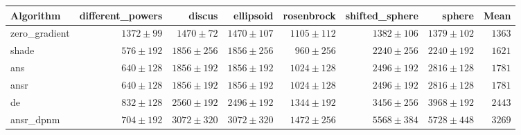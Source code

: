 \begin{tabular}{lrrrrrrr}
\toprule
Algorithm & different\_powers & discus & ellipsoid & rosenbrock & shifted\_sphere & sphere & Mean \\
\midrule
zero\_gradient & $1372 \pm 99$ & $1470 \pm 72$ & $1470 \pm 107$ & $1105 \pm 112$ & $1382 \pm 106$ & $1379 \pm 102$ & $1363$ \\
shade & $576 \pm 192$ & $1856 \pm 256$ & $1856 \pm 256$ & $960 \pm 256$ & $2240 \pm 256$ & $2240 \pm 192$ & $1621$ \\
ans & $640 \pm 128$ & $1856 \pm 192$ & $1856 \pm 192$ & $1024 \pm 128$ & $2496 \pm 192$ & $2816 \pm 128$ & $1781$ \\
ansr & $640 \pm 128$ & $1856 \pm 192$ & $1856 \pm 192$ & $1024 \pm 128$ & $2496 \pm 192$ & $2816 \pm 128$ & $1781$ \\
de & $832 \pm 128$ & $2560 \pm 192$ & $2496 \pm 192$ & $1344 \pm 192$ & $3456 \pm 256$ & $3968 \pm 192$ & $2443$ \\
ansr\_dpnm & $704 \pm 192$ & $3072 \pm 320$ & $3072 \pm 320$ & $1472 \pm 256$ & $5568 \pm 384$ & $5728 \pm 448$ & $3269$ \\
\bottomrule
\end{tabular}
